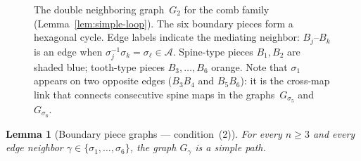 \documentclass{amsart}
\newtheorem{lemma}[theorem]{Lemma}
\theoremstyle{definition}
\theoremstyle{remark}
\begin{document}
\begin{figure}[ht]
\centering
{}
\caption{The double neighboring graph~$G_2$ for the comb family
  (Lemma~\ref{lem:simple-loop}).  The six boundary pieces form a
  hexagonal cycle.  Edge labels indicate the mediating neighbor:
  $B_j$--$B_k$ is an edge when
  $\sigma_j^{-1}\sigma_k = \sigma_\ell \in \mathcal{A}$.
  Spine-type pieces $B_1, B_2$ are shaded blue; tooth-type pieces
  $B_3, \ldots, B_6$ orange.  Note that $\sigma_1$ appears on two
  opposite edges ($B_3 B_4$ and $B_5 B_6$): it is the cross-map
  link that connects consecutive spine maps in the
  graphs~$G_{\sigma_5}$ and~$G_{\sigma_6}$.}
\label{fig:g2-cycle}
\end{figure}

\begin{lemma}[Boundary piece graphs --- condition~(2)]%
\label{lem:simple-path}
For every $n \ge 3$ and every edge neighbor $\gamma \in \{\sigma_1,
\ldots, \sigma_6\}$, the graph $G_\gamma$ is a simple path.
\end{lemma}
\end{document}
